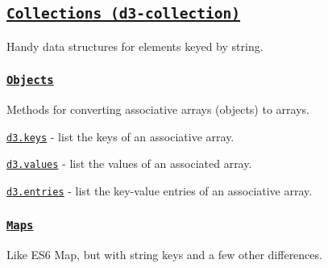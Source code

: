 \subsection*{\href{https://github.com/d3/d3-collection}{\tt Collections (d3-\/collection)}}

Handy data structures for elements keyed by string.

\subsubsection*{\href{https://github.com/d3/d3-collection/blob/master/README.md#objects}{\tt Objects}}

Methods for converting associative arrays (objects) to arrays.


\begin{DoxyItemize}
\item \href{https://github.com/d3/d3-collection/blob/master/README.md#keys}{\tt d3.\+keys} -\/ list the keys of an associative array.
\item \href{https://github.com/d3/d3-collection/blob/master/README.md#values}{\tt d3.\+values} -\/ list the values of an associated array.
\item \href{https://github.com/d3/d3-collection/blob/master/README.md#entries}{\tt d3.\+entries} -\/ list the key-\/value entries of an associative array.
\end{DoxyItemize}

\subsubsection*{\href{https://github.com/d3/d3-collection/blob/master/README.md#maps}{\tt Maps}}

Like E\+S6 Map, but with string keys and a few other differences.


